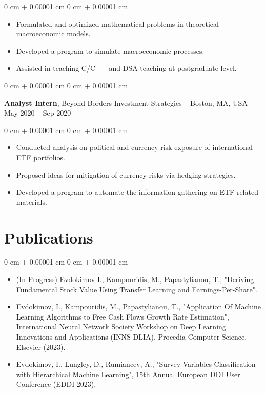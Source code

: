 \documentclass[10pt, letterpaper]{article}
\newenvironment{highlights}{
    \begin{itemize}[
        topsep=0.10 cm,
        parsep=0.10 cm,
        partopsep=0pt,
        itemsep=0pt,
        leftmargin=0 cm + 10pt
    ]
}{
    \end{itemize}
} %
\newenvironment{onecolentry}{
    \begin{adjustwidth}{
        0 cm + 0.00001 cm
    }{
        0 cm + 0.00001 cm
    }
}{
    \end{adjustwidth}
} %
\newenvironment{twocolentry}[2][]{
    \onecolentry
    \def\secondColumn{#2}
    \setcolumnwidth{\fill, 4.5 cm}
    \begin{paracol}{2}
}{
    \switchcolumn \raggedleft \secondColumn
    \end{paracol}
    \endonecolentry
} %
\begin{document}
        \vspace{0.10 cm}
        \begin{onecolentry}
            \begin{highlights}
                  \item Formulated and optimized mathematical problems in theoretical macroeconomic models.
                  \item Developed a program to simulate macroeconomic processes.
                  \item Assisted in teaching C/C++ and DSA teaching at postgraduate level.
            \end{highlights}
        \end{onecolentry}
    
        \vspace{0.2 cm}

        \begin{twocolentry}{
            May 2020 – Sep 2020
        }
            \textbf{Analyst Intern}, Beyond Borders Investment Strategies -- Boston, MA, USA\end{twocolentry}

        \vspace{0.10 cm}
        \begin{onecolentry}
            \begin{highlights}
              \item Conducted analysis on political and currency risk exposure of international ETF portfolios.
              \item Proposed ideas for mitigation of currency risks via hedging strategies.
              \item Developed a program to automate the information gathering on ETF-related materials.
            \end{highlights}
        \end{onecolentry}
    \section{Publications}

    \begin{onecolentry}
        \begin{highlights}
            \item (In Progress) Evdokimov I., Kampouridis, M., Papastylianou, T., "Deriving Fundamental Stock Value Using Transfer Learning and Earnings-Per-Share".
            \item Evdokimov, I., Kampouridis, M., Papastylianou, T., "Application Of Machine Learning Algorithms to Free Cash Flows Growth Rate Estimation", International Neural Network Society Workshop on Deep Learning Innovations and Applications (INNS DLIA), Procedia Computer Science, Elsevier (2023).
            \item Evdokimov, I., Lungley, D., Rumiancev, A., "Survey Variables Classification with Hierarchical Machine Learning", 15th Annual European DDI User Conference (EDDI 2023).
        \end{highlights}
    \end{onecolentry}
\end{document}
